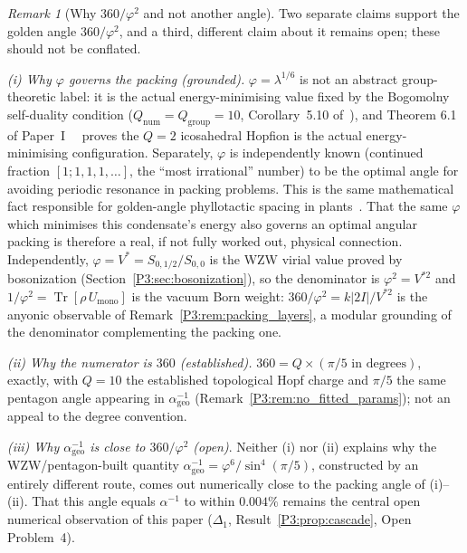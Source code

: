 \documentclass[11pt,a4paper]{article}
\theoremstyle{definition}
\theoremstyle{remark}
\newtheorem{remark}[theorem]{Remark}
\newcommand{\vp}{\varphi}
\newcommand{\lam}{\lambda}
\newcommand{\aInv}{\alpha^{-1}}
\begin{document}
\begin{remark}[Why $360/\vp^2$ and not another angle]
\label{P3:rem:why_golden_angle}
Two separate claims support the golden angle $360/\vp^2$, and a third,
different claim about it remains open; these should not be conflated.

\emph{(i) Why $\vp$ governs the packing (grounded).} $\vp=\lam^{1/6}$ is
not an abstract group-theoretic label: it is the actual energy-minimising
value fixed by the Bogomolny self-duality condition
($Q_{\mathrm{num}}=Q_{\mathrm{group}}=10$, Corollary~5.10
of~\cite{Paper1}), and Theorem 6.1 of Paper~I~\cite{Paper1}%
\ proves the $Q=2$
icosahedral Hopfion is the actual energy-minimising configuration. Separately,
$\vp$ is independently known (continued fraction $[1;1,1,1,\ldots]$, the
``most irrational'' number) to be the optimal angle for avoiding periodic
resonance in packing problems. This is the same mathematical fact responsible
for golden-angle phyllotactic spacing in plants~\cite{Jean1994}. That the
same $\vp$ which minimises this condensate's energy also governs an
optimal angular packing is therefore a real, if not fully worked out,
physical connection.  Independently, $\vp = V^{*} = S_{0,1/2}/S_{0,0}$ is
the WZW virial value proved by bosonization
(Section~\ref{P3:sec:bosonization}), so the denominator is $\vp^2=V^{*2}$
and $1/\vp^2 = \operatorname{Tr}[\rho\,U_{\mathrm{mono}}]$ is the vacuum
Born weight: $360/\vp^2 = k|2I|/V^{*2}$ is the anyonic observable of
Remark~\ref{P3:rem:packing_layers}, a modular grounding of the denominator
complementing the packing one.

\emph{(ii) Why the numerator is $360$ (established).} $360 =
Q\times(\pi/5\text{ in degrees})$, exactly, with $Q=10$ the established
topological Hopf charge and $\pi/5$ the same pentagon angle appearing in
$\aInv_{\mathrm{geo}}$ (Remark~\ref{P3:rem:no_fitted_params}); not an
appeal to the degree convention.

\emph{(iii) Why $\aInv_{\mathrm{geo}}$ is close to $360/\vp^2$ (open)}.
Neither (i) nor (ii) explains why the WZW/pentagon-built quantity
$\aInv_{\mathrm{geo}}=\vp^6/\sin^4(\pi/5)$, constructed by an entirely
different route, comes out numerically close to the packing angle of
(i)--(ii). That this angle equals $\aInv$ to within $0.004\%$ remains the
central open numerical observation of this paper ($\Delta_1$,
Result~\ref{P3:prop:cascade}, Open Problem~4).
\end{remark}

\end{document}
